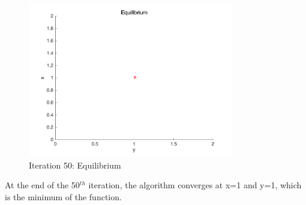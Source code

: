 \begin{figure}[H]
\begin{center}
\includegraphics[width=0.8\textwidth]{img/mdme/equilibrium50}
\caption{Iteration 50: Equilibrium}
\end{center}
\end{figure}

At the end of the 50$^{th}$ iteration, the algorithm converges at x=1 and y=1, which is the minimum of the function.
